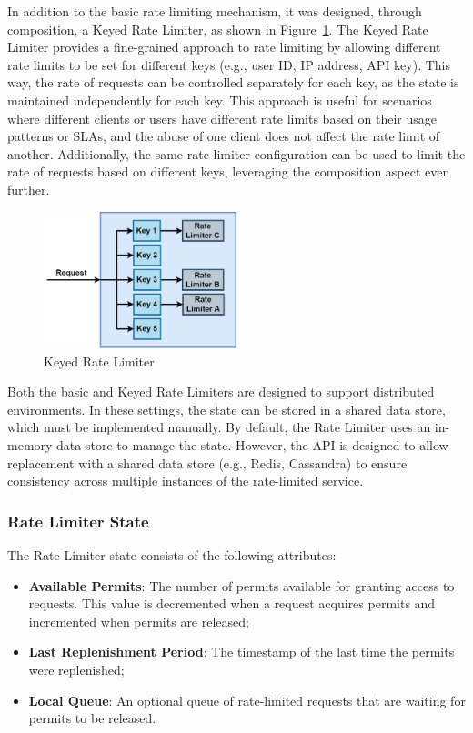 In addition to the basic rate limiting mechanism, it was designed, through composition, a Keyed Rate Limiter, as shown in Figure~\ref{fig:keyed-rate-limiter}.
The Keyed Rate Limiter provides a fine-grained approach to rate limiting
by allowing different rate limits to be set for different keys
(e.g., user ID, IP address, API key).
This way, the rate of requests can be controlled separately for each key, as the state is maintained
independently for each key.
This approach is useful for scenarios
where different clients or users have different rate limits based on their usage patterns or SLAs,
and the abuse of one client does not affect the rate limit of another.
Additionally, the same rate limiter configuration can be used to limit the rate of requests based on different keys,
leveraging the composition aspect even further.

\begin{figure}[!htb]
    \centering
    \includegraphics[width=0.5\textwidth]{../figures/06_keyed-rate-limiter}
    \caption{Keyed Rate Limiter}
    \label{fig:keyed-rate-limiter}
\end{figure}

Both the basic and Keyed Rate Limiters are designed to support distributed environments.
In these settings, the state can be stored in a shared data store,
which must be implemented manually.
By default, the Rate Limiter uses an in-memory data store to manage the state.
However,
the API is designed to allow replacement with a shared data store
(e.g., Redis, Cassandra) to ensure consistency across multiple instances of the rate-limited service.

\subsubsection{Rate Limiter State}\label{subsubsec:rate-limiter-state}

The Rate Limiter state consists of the following attributes:

\begin{itemize}
    \item \textbf{Available Permits}: The number of permits available for granting access to requests.
    This value is decremented when a request acquires permits and incremented when permits are released;
    \item \textbf{Last Replenishment Period}: The timestamp of the last time the permits were replenished;
    \item \textbf{Local Queue}: An optional queue of rate-limited requests that are waiting for permits to be released.
\end{itemize}

